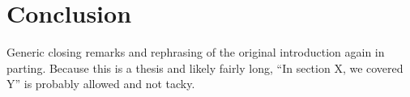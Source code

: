 \section{Conclusion}

Generic closing remarks and rephrasing of the original introduction again
in parting.
%
Because this is a thesis and likely fairly long, ``In section X, we covered Y''
is probably allowed and not tacky.


